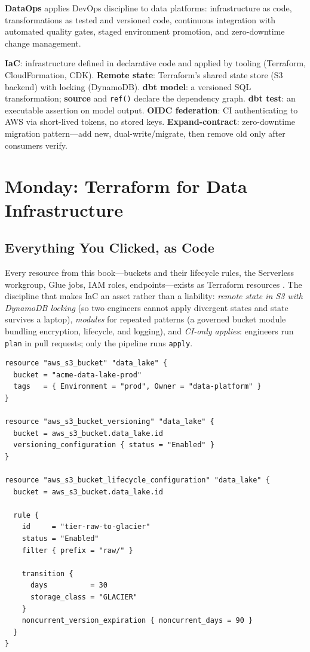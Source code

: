 \begin{definitionbox}
\textbf{DataOps} applies DevOps discipline to data platforms: infrastructure as code, transformations as tested and versioned code, continuous integration with automated quality gates, staged environment promotion, and zero-downtime change management.
\end{definitionbox}

\begin{keyterms}
\textbf{IaC}: infrastructure defined in declarative code and applied by tooling (Terraform, CloudFormation, CDK). \textbf{Remote state}: Terraform's shared state store (S3 backend) with locking (DynamoDB). \textbf{dbt model}: a versioned SQL transformation; \textbf{source} and \texttt{ref()} declare the dependency graph. \textbf{dbt test}: an executable assertion on model output. \textbf{OIDC federation}: CI authenticating to AWS via short-lived tokens, no stored keys. \textbf{Expand-contract}: zero-downtime migration pattern---add new, dual-write/migrate, then remove old only after consumers verify.
\end{keyterms}

\section{Monday: Terraform for Data Infrastructure}
\subsection{Everything You Clicked, as Code}
Every resource from this book---buckets and their lifecycle rules, the Serverless workgroup, Glue jobs, IAM roles, endpoints---exists as Terraform resources \cite{terraformAWSProvider}. The discipline that makes IaC an asset rather than a liability: \emph{remote state in S3 with DynamoDB locking} (so two engineers cannot apply divergent states and state survives a laptop), \emph{modules} for repeated patterns (a governed bucket module bundling encryption, lifecycle, and logging), and \emph{CI-only applies}: engineers run \texttt{plan} in pull requests; only the pipeline runs \texttt{apply}.

\begin{lstlisting}[caption={A governed data-lake bucket as Terraform.},label={lst:ch24-terraform}]
resource "aws_s3_bucket" "data_lake" {
  bucket = "acme-data-lake-prod"
  tags   = { Environment = "prod", Owner = "data-platform" }
}

resource "aws_s3_bucket_versioning" "data_lake" {
  bucket = aws_s3_bucket.data_lake.id
  versioning_configuration { status = "Enabled" }
}

resource "aws_s3_bucket_lifecycle_configuration" "data_lake" {
  bucket = aws_s3_bucket.data_lake.id

  rule {
    id     = "tier-raw-to-glacier"
    status = "Enabled"
    filter { prefix = "raw/" }

    transition {
      days          = 30
      storage_class = "GLACIER"
    }
    noncurrent_version_expiration { noncurrent_days = 90 }
  }
}
\end{lstlisting}

